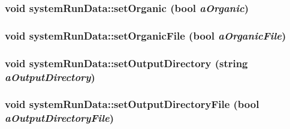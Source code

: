\label{classsystem_run_data_a4cafdae5fe793c31745b55d8b4df93b6}
\hypertarget{classsystem_run_data_a346f825429eaaa8ee3a5f525a172ef11}{
\subsubsection[{setOrganic}]{\setlength{\rightskip}{0pt plus 5cm}void systemRunData::setOrganic (bool {\em aOrganic})}}
\label{classsystem_run_data_a346f825429eaaa8ee3a5f525a172ef11}
\hypertarget{classsystem_run_data_ad777a7105ce6dedf4f775600e29a6775}{
\subsubsection[{setOrganicFile}]{\setlength{\rightskip}{0pt plus 5cm}void systemRunData::setOrganicFile (bool {\em aOrganicFile})}}
\label{classsystem_run_data_ad777a7105ce6dedf4f775600e29a6775}
\hypertarget{classsystem_run_data_ac8e56338e653414b63caa5c89dacfa63}{
\subsubsection[{setOutputDirectory}]{\setlength{\rightskip}{0pt plus 5cm}void systemRunData::setOutputDirectory (string {\em aOutputDirectory})}}
\label{classsystem_run_data_ac8e56338e653414b63caa5c89dacfa63}
\hypertarget{classsystem_run_data_aa1e564e131ec1b124b81e107aba4e5d6}{
\subsubsection[{setOutputDirectoryFile}]{\setlength{\rightskip}{0pt plus 5cm}void systemRunData::setOutputDirectoryFile (bool {\em aOutputDirectoryFile})}}
